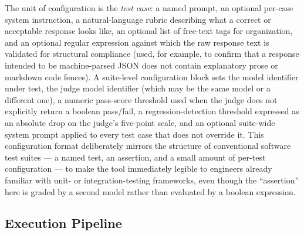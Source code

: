 \documentclass[11pt,a4paper]{article}
\begin{document}
The unit of configuration is the \emph{test case}: a named prompt, an
optional per-case system instruction, a natural-language rubric
describing what a correct or acceptable response looks like, an optional
list of free-text tags for organization, and an optional regular
expression against which the raw response text is validated for
structural compliance (used, for example, to confirm that a response
intended to be machine-parsed JSON does not contain explanatory prose or
markdown code fences). A suite-level configuration block sets the model
identifier under test, the judge model identifier (which may be the same
model or a different one), a numeric pass-score threshold used when the
judge does not explicitly return a boolean pass/fail, a
regression-detection threshold expressed as an absolute drop on the
judge's five-point scale, and an optional suite-wide
system prompt applied to every test case that does not override it. This
configuration format deliberately mirrors the structure of conventional
software test suites --- a named test, an assertion, and a small amount
of per-test configuration --- to make the tool immediately legible to
engineers already familiar with unit- or integration-testing frameworks,
even though the ``assertion'' here is graded by a second model rather than
evaluated by a boolean expression.

\subsection{Execution Pipeline}
\end{document}
